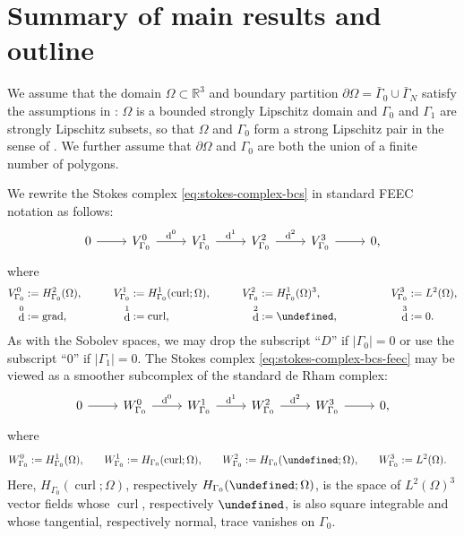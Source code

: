 \documentclass{mcom-l}
\theoremstyle{definition}
\theoremstyle{remark}
\numberwithin{equation}{section}
\let\div\undefined
\DeclareMathOperator{\curl}{curl}
\DeclareMathOperator{\grad}{grad}
\DeclareMathOperator{\div}{div}
\DeclareMathOperator{\dee}{d}
\begin{document}
\section{Summary of main results and outline}
\label{sec:main-results}

We assume that the domain $\Omega \subset \mathbb{R}^3$ and boundary partition
$\partial \Omega = \bar{\Gamma}_0 \cup \bar{\Gamma}_N$ satisfy the assumptions 
in \cite{PaulySchomburg22}: $\Omega$ is a bounded strongly 
Lipschitz domain and $\Gamma_0$ and $\Gamma_1$ are strongly Lipschitz subsets,
so that $\Omega$ and $\Gamma_0$ form a strong Lipschitz pair 
in the sense of \cite[Definition 2.11]{BauerPaulySchomburg19}.
We further assume that $\partial \Omega$ and $\Gamma_0$ are both the
union of a finite number of polygons.

We rewrite the Stokes complex \cref{eq:stokes-complex-bcs} in standard
FEEC notation as follows:
\begin{equation}
	\label{eq:stokes-complex-bcs-feec}
	\begin{tikzcd}
		0 \arrow[r] 
		& V_{\Gamma_0}^0 \arrow[r, "\dee^0"] 
		& V_{\Gamma_0}^1 \arrow[r, "\dee^1"] 
		& V_{\Gamma_0}^2 \arrow[r, "\dee^2"]
		& V_{\Gamma_0}^3 \arrow[r]
		& 0,
	\end{tikzcd}
\end{equation}
where 
\begin{alignat*}{4}
	V_{\Gamma_0}^0 &:= H^2_{\Gamma_0}(\Omega), \qquad & 
	V_{\Gamma_0}^1 &:= H^1_{\Gamma_0}(\curl; \Omega), \qquad & 
	V_{\Gamma_0}^2 &:= H^1_{\Gamma_0}(\Omega)^3, & \qquad 
	V_{\Gamma_0}^3 &:= L^2(\Omega), \\
	\dee^0 &:= \grad, \qquad & 
	\dee^1 &:= \curl, \qquad & 
	\dee^2 &:= \div, \qquad & 
	\dee^3 &:= 0.
\end{alignat*}
As with the Sobolev spaces, we may 
drop the subscript ``$D$'' if $|\Gamma_0| = 0$ or use the 
subscript ``0'' if $|\Gamma_1| = 0$. The Stokes complex 
\cref{eq:stokes-complex-bcs-feec} may be viewed as 
a smoother subcomplex of the standard de Rham complex:
\begin{equation}
	\label{eq:de-rham-complex-bcs-feec}
	\begin{tikzcd}
		0 \arrow[r] 
		& W_{\Gamma_0}^0 \arrow[r, "\dee^0"] 
		& W_{\Gamma_0}^1 \arrow[r, "\dee^1"] 
		& W_{\Gamma_0}^2 \arrow[r, "\dee^2"]
		& W_{\Gamma_0}^3 \arrow[r]
		& 0,
	\end{tikzcd}
\end{equation}
where 
\begin{alignat*}{4}
	W_{\Gamma_0}^0 &:= H^1_{\Gamma_0}(\Omega), \quad 
	& W_{\Gamma_0}^1 &:= H_{\Gamma_0}(\curl; \Omega), \quad 
	& W_{\Gamma_0}^2 &:= H_{\Gamma_0}(\div; \Omega), \quad
	& W_{\Gamma_0}^3 &:= L^2(\Omega).
\end{alignat*}
Here, $H_{\Gamma_0}(\curl; \Omega)$, respectively $H_{\Gamma_0}(\div; \Omega)$, is the space of 
$L^2(\Omega)^3$ vector fields whose $\curl$, respectively $\div$, is also 
square integrable and whose tangential, respectively normal, trace vanishes 
on $\Gamma_0$.
\end{document}
